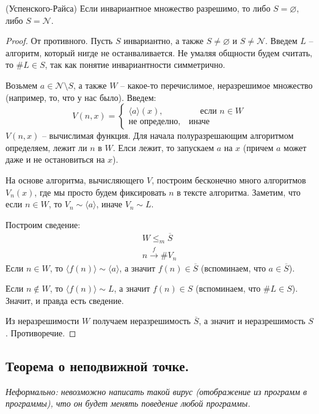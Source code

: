 \begin{theorem} (Успенского-Райса)
    Если инвариантное множество разрешимо, то либо $S = \varnothing$, либо $S = \mathcal{N}$.  
\end{theorem}
\begin{proof}
    От противного. Пусть $S$ инвариантно, а также $S \neq \varnothing$ и $S \neq \mathcal{N}$. Введем $L$ -- алгоритм, который нигде не останваливается. Не умаляя общности будем считать, то $\#L \in S$, так как понятие инвариантности симметрично.

    Возьмем $a \in \mathcal{N} \setminus S$, а также $W$ -- какое-то перечислимое, неразрешимое множество (например, то, что у нас было). Введем: \[ V(n, x) = \begin{cases}
        \langle a \rangle (x), \quad\quad\quad\quad\; \text{если } n \in W \\
        \text{не определно}, \quad \text{иначе}
    \end{cases} \]
    $V(n, x)$ -- вычислимая функция. Для начала полуразрешающим алгоритмом определяем, лежит ли $n$ в $W$. Елси лежит, то запускаем $a$ на $x$ (причем $a$ может даже и не остановиться на $x$).

    На основе алгоритма, вычисляющего $V$, построим бесконечно много алгоритмов $V_n(x)$, где мы просто будем фиксировать $n$ в тексте алгоритма. Заметим, что если $n \in W$, то $V_n \sim \langle a \rangle$, иначе $V_n \sim L$.

    Построим сведение: \begin{gather*}
        W \leqslant_m \overline{S} \\
        n \xrightarrow{f} \#V_n
    \end{gather*}
    Если $n \in W$, то $\langle f(n) \rangle \sim \langle a \rangle$, а значит $f(n) \in \overline{S}$ (вспоминаем, что $a \in \overline{S}$).

    Если $n \notin W$, то $\langle f(n) \rangle \sim L$, а значит $f(n) \in S$ (вспоминаем, что $\#L \in S$). Значит, и правда есть сведение.

    Из неразрешимости $W$ получаем неразрешимость $\overline{S}$, а значит и неразрешимость $S$. Противоречие.
\end{proof}

\subsection{Теорема о неподвижной точке.}

\textit{Неформально: невозможно написать такой вирус (отображение из программ в программы), что он будет менять поведение любой программы.}

